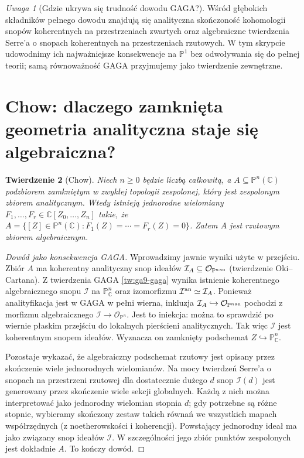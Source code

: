\documentclass[11pt,a4paper,openany]{report}
\numberwithin{equation}{section}
\theoremstyle{plain}
\newtheorem{twierdzenie}{Twierdzenie}[section]
\theoremstyle{definition}
\theoremstyle{remark}
\newtheorem{uwaga}[twierdzenie]{Uwaga}
\newcommand{\C}{\mathbb C}
\newcommand{\PP}{\mathbb P}
\begin{document}
\begin{uwaga}[Gdzie ukrywa się trudność dowodu GAGA?]
Wśród głębokich składników pełnego dowodu znajdują się
analityczna skończoność kohomologii snopów koherentnych
na przestrzeniach zwartych oraz algebraiczne twierdzenia
Serre'a o snopach koherentnych na przestrzeniach rzutowych.
W tym skrypcie udowodnimy ich najważniejsze konsekwencje
na $\PP^1$ bez odwoływania się do pełnej teorii; samą
równoważność GAGA przyjmujemy jako twierdzenie zewnętrzne.
\end{uwaga}

\section{Chow: dlaczego zamknięta geometria analityczna staje się algebraiczna?}
\label{sec:ga9-chow}

\begin{twierdzenie}[Chow]
\label{tw:ga9-chow}
Niech $n\ge0$ będzie liczbą całkowitą, a
$A\subseteq\PP^n(\C)$ podzbiorem zamkniętym
w zwykłej topologii zespolonej, który
jest zespolonym zbiorem analitycznym. Wtedy istnieją
jednorodne wielomiany $F_1,\ldots,F_r\in\C[Z_0,\ldots,Z_n]$
takie, że
$A=\{[Z]\in\PP^n(\C):F_1(Z)=\cdots=F_r(Z)=0\}$.
Zatem $A$ jest rzutowym zbiorem algebraicznym.
\end{twierdzenie}
\begin{proof}[Dowód jako konsekwencja GAGA]
Wprowadzimy jawnie wyniki użyte w przejściu.
Zbiór $A$ ma koherentny analityczny snop ideałów
$\mathcal I_A\subseteq\mathcal O_{\PP^n{}^{\rm an}}$
(twierdzenie Oki--Cartana). Z twierdzenia GAGA
\ref{tw:ga9-gaga} wynika istnienie koherentnego
algebraicznego snopu $\mathcal I$ na $\PP^n_\C$
oraz izomorfizmu $\mathcal I^{\rm an}\simeq\mathcal I_A$.
Ponieważ analityfikacja jest w GAGA w pełni wierna,
inkluzja $\mathcal I_A\hookrightarrow\mathcal O_{\PP^n{}^{\rm an}}$
pochodzi z morfizmu algebraicznego
$\mathcal I\to\mathcal O_{\PP^n}$. Jest to iniekcja:
można to sprawdzić po wiernie płaskim przejściu do
lokalnych pierścieni analitycznych. Tak więc
$\mathcal I$ jest koherentnym snopem ideałów.
Wyznacza on zamknięty podschemat
$Z\hookrightarrow\PP^n_\C$.

Pozostaje wykazać, że algebraiczny podschemat rzutowy
jest opisany przez skończenie wiele jednorodnych
wielomianów. Na mocy twierdzeń Serre'a o snopach
na przestrzeni rzutowej dla dostatecznie dużego $d$
snop $\mathcal I(d)$ jest generowany przez skończenie
wiele sekcji globalnych. Każdą z nich można
interpretować jako jednorodny wielomian stopnia $d$;
gdy potrzebne są różne stopnie, wybieramy skończony
zestaw takich równań we wszystkich mapach współrzędnych
(z noetherowskości i koherencji). Powstający
jednorodny ideał ma jako związany snop ideałów
$\mathcal I$. W szczególności jego zbiór punktów
zespolonych jest dokładnie $A$. To kończy dowód.
\end{proof}
\end{document}
